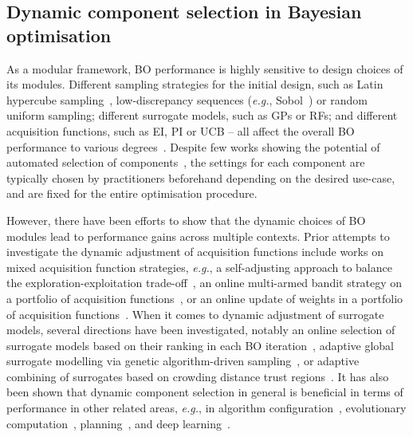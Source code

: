 \subsection{Dynamic component selection in Bayesian optimisation}
As a modular framework, BO performance is highly sensitive to design choices of its modules. 
Different sampling strategies for the initial design, such as Latin hypercube sampling~\citep{McKEtAl00}, low-discrepancy sequences (\emph{e.g.}, Sobol~\citep{AntSal79}) or random uniform sampling; different surrogate models, such as GPs or RFs; and different acquisition functions, such as EI, PI or UCB -- all affect the overall BO performance to various degrees~\citep{BosEtAl20,LinEtAl19,CowEtAl22}. 
Despite few works showing the potential of automated selection of components~\citep{SalTom18,BenEtAl22c,BenEtAl22c}, the settings for each component are typically chosen by practitioners beforehand depending on the desired use-case, and are fixed for the entire optimisation procedure.

However, there have been efforts to show that the dynamic choices of BO modules lead to performance gains across multiple contexts.
Prior attempts to investigate the dynamic adjustment of acquisition functions include works on mixed acquisition function strategies, \emph{e.g.}, a self-adjusting approach to balance the exploration-exploitation trade-off~\citep{BenEtAl23}, an online multi-armed bandit strategy on a portfolio of acquisition functions~\citep{HofEtAl11b}, or an online update of weights in a portfolio of acquisition functions~\citep{KanEtAl20}.
When it comes to dynamic adjustment of surrogate models, several directions have been investigated, notably an online selection of surrogate models based on their ranking in each BO iteration~\citep{BagEtAl16}, adaptive global surrogate modelling via genetic algorithm-driven sampling~\citep{GorEtAl09}, or adaptive combining of surrogates based on crowding distance trust regions~\citep{ZhaEtAl12}.
It has also been shown that dynamic component selection in general is beneficial in terms of performance in other related areas, \emph{e.g.}, in algorithm configuration~\citep{BieEtAl20}, evolutionary computation~\citep{KarEtAl15,DoeDoe20}, planning~\citep{SpeEtAl21}, and deep learning~\citep{AdrEtAl22}.

